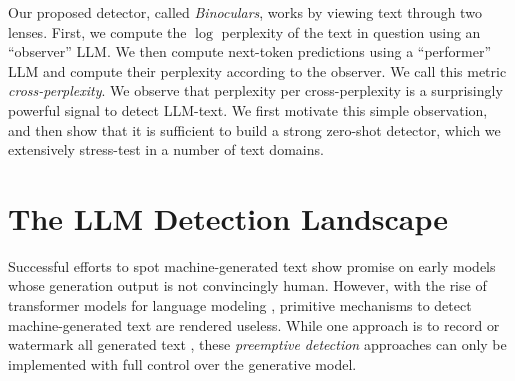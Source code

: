 \documentclass{article} %
\begin{document}

Our proposed detector, called {\em Binoculars}, works by viewing text through two lenses. 
First, we compute the $\log$ perplexity of the text in question using an ``observer'' LLM.
We then compute next-token predictions using a ``performer'' LLM and compute their perplexity according to the observer. We call this metric \textit{cross-perplexity}. We observe that perplexity per cross-perplexity is a surprisingly powerful signal to detect LLM-text.
We first motivate this simple observation, and then show that it is sufficient to build a strong zero-shot detector, which we extensively stress-test in a number of text domains.


\section{The LLM Detection Landscape}
\label{sec:related-work}


Successful efforts to spot machine-generated text show promise on early models whose generation output is not convincingly human.
However, with the rise of transformer models for language modeling \citep{radford_language_2019,brown_language_2020,chowdhery_palm_2022,touvron_llama_2023-1}, primitive mechanisms to detect machine-generated text are rendered useless.
While one approach is to record \citep{krishna_paraphrasing_2023} or watermark all generated text \citep{kirchenbauer_watermark_2023}, these \emph{preemptive detection} approaches can only be implemented with full control over the generative model. 
\end{document}
